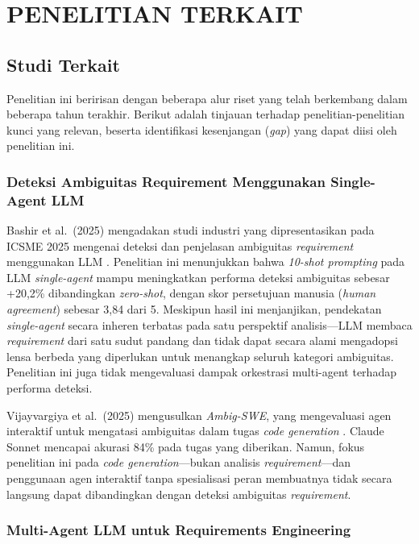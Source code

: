 \chapter{PENELITIAN TERKAIT}

\section{Studi Terkait}

Penelitian ini beririsan dengan beberapa alur riset yang telah berkembang dalam beberapa tahun terakhir. Berikut adalah tinjauan terhadap penelitian-penelitian kunci yang relevan, beserta identifikasi kesenjangan (\textit{gap}) yang dapat diisi oleh penelitian ini.

\subsection{Deteksi Ambiguitas Requirement Menggunakan Single-Agent LLM}

Bashir et al.\ (2025) mengadakan studi industri yang dipresentasikan pada ICSME 2025 mengenai deteksi dan penjelasan ambiguitas \textit{requirement} menggunakan LLM \cite{bashir2025}. Penelitian ini menunjukkan bahwa \textit{10-shot prompting} pada LLM \textit{single-agent} mampu meningkatkan performa deteksi ambiguitas sebesar +20,2\% dibandingkan \textit{zero-shot}, dengan skor persetujuan manusia (\textit{human agreement}) sebesar 3,84 dari 5. Meskipun hasil ini menjanjikan, pendekatan \textit{single-agent} secara inheren terbatas pada satu perspektif analisis—LLM membaca \textit{requirement} dari satu sudut pandang dan tidak dapat secara alami mengadopsi lensa berbeda yang diperlukan untuk menangkap seluruh kategori ambiguitas. Penelitian ini juga tidak mengevaluasi dampak orkestrasi multi-agent terhadap performa deteksi.

Vijayvargiya et al.\ (2025) mengusulkan \textit{Ambig-SWE}, yang mengevaluasi agen interaktif untuk mengatasi ambiguitas dalam tugas \textit{code generation} \cite{vijayvargiya2025}. Claude Sonnet mencapai akurasi 84\% pada tugas yang diberikan. Namun, fokus penelitian ini pada \textit{code generation}—bukan analisis \textit{requirement}—dan penggunaan agen interaktif tanpa spesialisasi peran membuatnya tidak secara langsung dapat dibandingkan dengan deteksi ambiguitas \textit{requirement}.

\subsection{Multi-Agent LLM untuk Requirements Engineering}

